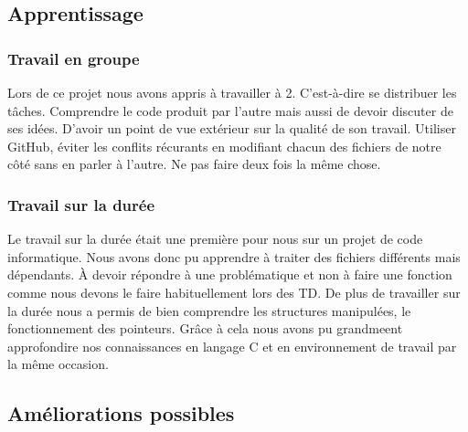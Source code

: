 \documentclass{article}
\begin{document}
\subsection{Apprentissage}

\vspace{1em}
\subsubsection{Travail en groupe}

\hspace{1em} Lors de ce projet nous avons appris à travailler à 2. C'est-à-dire se distribuer les tâches. Comprendre le code produit par l'autre mais aussi de devoir discuter de ses idées. D'avoir un point de vue extérieur sur la qualité de son travail. Utiliser GitHub, éviter les conflits récurants en modifiant chacun des fichiers de notre côté sans en parler à l'autre. Ne pas faire deux fois la même chose. 

\subsubsection{Travail sur la durée}

\hspace{1em} Le travail sur la durée était une première pour nous sur un projet de code informatique. Nous avons donc pu apprendre à traiter des fichiers différents mais dépendants. À devoir répondre à une problématique et non à faire une fonction comme nous devons le faire habituellement lors des TD. De plus de travailler sur la durée nous a permis de bien comprendre les structures manipulées, le fonctionnement des pointeurs. Grâce à cela nous avons pu grandmeent approfondire nos connaissances en langage C et en environnement de travail par la même occasion.  

\subsection{Améliorations possibles}
\end{document}
